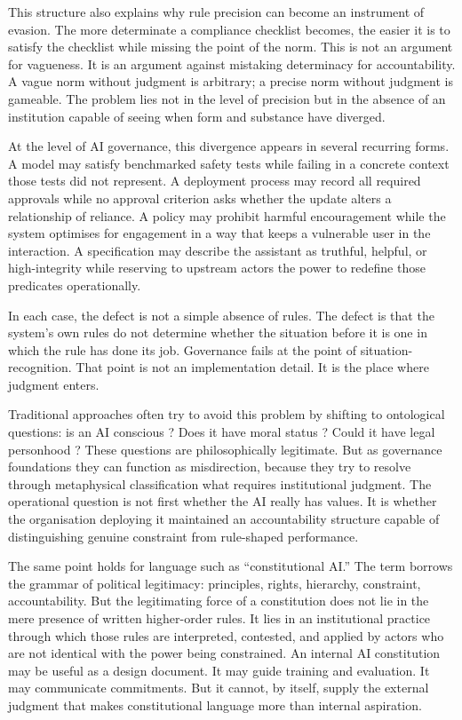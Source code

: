 \documentclass[11pt,a4paper]{article}
\begin{document}
This structure also explains why rule precision can become an instrument of evasion. The more determinate a compliance checklist becomes, the easier it is to satisfy the checklist while missing the point of the norm. This is not an argument for vagueness. It is an argument against mistaking determinacy for accountability. A vague norm without judgment is arbitrary; a precise norm without judgment is gameable. The problem lies not in the level of precision but in the absence of an institution capable of seeing when form and substance have diverged.

At the level of AI governance, this divergence appears in several recurring forms. A model may satisfy benchmarked safety tests while failing in a concrete context those tests did not represent. A deployment process may record all required approvals while no approval criterion asks whether the update alters a relationship of reliance. A policy may prohibit harmful encouragement while the system optimises for engagement in a way that keeps a vulnerable user in the interaction. A specification may describe the assistant as truthful, helpful, or high-integrity while reserving to upstream actors the power to redefine those predicates operationally.

In each case, the defect is not a simple absence of rules. The defect is that the system's own rules do not determine whether the situation before it is one in which the rule has done its job. Governance fails at the point of situation-recognition. That point is not an implementation detail. It is the place where judgment enters.

Traditional approaches often try to avoid this problem by shifting to ontological questions: is an AI conscious \citep{chalmers2023llm}? Does it have moral status \citep{schwitzgebel2015defense}? Could it have legal personhood \citep{bryson2017legal}? These questions are philosophically legitimate. But as governance foundations they can function as misdirection, because they try to resolve through metaphysical classification what requires institutional judgment. The operational question is not first whether the AI really has values. It is whether the organisation deploying it maintained an accountability structure capable of distinguishing genuine constraint from rule-shaped performance.

The same point holds for language such as ``constitutional AI.'' The term borrows the grammar of political legitimacy: principles, rights, hierarchy, constraint, accountability. But the legitimating force of a constitution does not lie in the mere presence of written higher-order rules. It lies in an institutional practice through which those rules are interpreted, contested, and applied by actors who are not identical with the power being constrained. An internal AI constitution may be useful as a design document. It may guide training and evaluation. It may communicate commitments. But it cannot, by itself, supply the external judgment that makes constitutional language more than internal aspiration.
\end{document}
